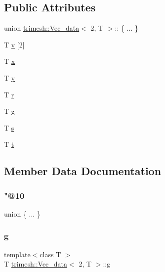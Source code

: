 \subsection*{Public Attributes}
\begin{DoxyCompactItemize}
\item 
union \hyperlink{structtrimesh_1_1Vec__data}{trimesh\+::\+Vec\+\_\+data}$<$ 2, T $>$\+:: \{ ... \}  
\item 
T \hyperlink{structtrimesh_1_1Vec__data_3_012_00_01T_01_4_a394fc35e00f449d849b05104f0276410}{v} \mbox{[}2\mbox{]}
\item 
T \hyperlink{structtrimesh_1_1Vec__data_3_012_00_01T_01_4_a516ae4d9b86b177b40f1f530d748fe3a}{x}
\item 
T \hyperlink{structtrimesh_1_1Vec__data_3_012_00_01T_01_4_a73ece1743d38b3798f51a30d7b86ae1b}{y}
\item 
T \hyperlink{structtrimesh_1_1Vec__data_3_012_00_01T_01_4_a267be51bf86367895cb47b60dcbbc201}{r}
\item 
T \hyperlink{structtrimesh_1_1Vec__data_3_012_00_01T_01_4_abd16421dd04ddc1b394f7dce4b89c2f7}{g}
\item 
T \hyperlink{structtrimesh_1_1Vec__data_3_012_00_01T_01_4_ab8c0f16ab79d13d335654e65aecd03f9}{s}
\item 
T \hyperlink{structtrimesh_1_1Vec__data_3_012_00_01T_01_4_a992bd618f23f3dc81303705c00a76e77}{t}
\end{DoxyCompactItemize}


\subsection{Member Data Documentation}
\mbox{\label{structtrimesh_1_1Vec__data_3_012_00_01T_01_4_a7f3e3f503425fe942cbe4b4aa1d642a2}} 
\subsubsection{\texorpdfstring{"@10}{@10}}
{\footnotesize\ttfamily union \{ ... \} }

\mbox{\label{structtrimesh_1_1Vec__data_3_012_00_01T_01_4_abd16421dd04ddc1b394f7dce4b89c2f7}} 
\subsubsection{\texorpdfstring{g}{g}}
{\footnotesize\ttfamily template$<$class T $>$ \\
T \hyperlink{structtrimesh_1_1Vec__data}{trimesh\+::\+Vec\+\_\+data}$<$ 2, T $>$\+::g}

